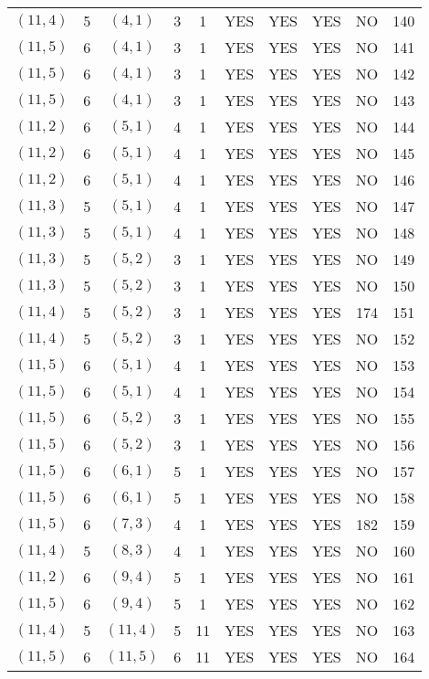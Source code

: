 \begin{longtable}{|c|c|c|c|c|c|c|c|c|c|}
$(11, 4)$ & 5 & $(4, 1)$ & 3 & 1 & YES & YES & YES & NO & 140\\
$(11, 5)$ & 6 & $(4, 1)$ & 3 & 1 & YES & YES & YES & NO & 141\\
$(11, 5)$ & 6 & $(4, 1)$ & 3 & 1 & YES & YES & YES & NO & 142\\
$(11, 5)$ & 6 & $(4, 1)$ & 3 & 1 & YES & YES & YES & NO & 143\\
$(11, 2)$ & 6 & $(5, 1)$ & 4 & 1 & YES & YES & YES & NO & 144\\
$(11, 2)$ & 6 & $(5, 1)$ & 4 & 1 & YES & YES & YES & NO & 145\\
$(11, 2)$ & 6 & $(5, 1)$ & 4 & 1 & YES & YES & YES & NO & 146\\
$(11, 3)$ & 5 & $(5, 1)$ & 4 & 1 & YES & YES & YES & NO & 147\\
$(11, 3)$ & 5 & $(5, 1)$ & 4 & 1 & YES & YES & YES & NO & 148\\
$(11, 3)$ & 5 & $(5, 2)$ & 3 & 1 & YES & YES & YES & NO & 149\\
$(11, 3)$ & 5 & $(5, 2)$ & 3 & 1 & YES & YES & YES & NO & 150\\
$(11, 4)$ & 5 & $(5, 2)$ & 3 & 1 & YES & YES & YES & 174 & 151\\
$(11, 4)$ & 5 & $(5, 2)$ & 3 & 1 & YES & YES & YES & NO & 152\\
$(11, 5)$ & 6 & $(5, 1)$ & 4 & 1 & YES & YES & YES & NO & 153\\
$(11, 5)$ & 6 & $(5, 1)$ & 4 & 1 & YES & YES & YES & NO & 154\\
$(11, 5)$ & 6 & $(5, 2)$ & 3 & 1 & YES & YES & YES & NO & 155\\
$(11, 5)$ & 6 & $(5, 2)$ & 3 & 1 & YES & YES & YES & NO & 156\\
$(11, 5)$ & 6 & $(6, 1)$ & 5 & 1 & YES & YES & YES & NO & 157\\
$(11, 5)$ & 6 & $(6, 1)$ & 5 & 1 & YES & YES & YES & NO & 158\\
$(11, 5)$ & 6 & $(7, 3)$ & 4 & 1 & YES & YES & YES & 182 & 159\\
$(11, 4)$ & 5 & $(8, 3)$ & 4 & 1 & YES & YES & YES & NO & 160\\
$(11, 2)$ & 6 & $(9, 4)$ & 5 & 1 & YES & YES & YES & NO & 161\\
$(11, 5)$ & 6 & $(9, 4)$ & 5 & 1 & YES & YES & YES & NO & 162\\
$(11, 4)$ & 5 & $(11, 4)$ & 5 & 11 & YES & YES & YES & NO & 163\\
$(11, 5)$ & 6 & $(11, 5)$ & 6 & 11 & YES & YES & YES & NO & 164\\

\end{longtable}

